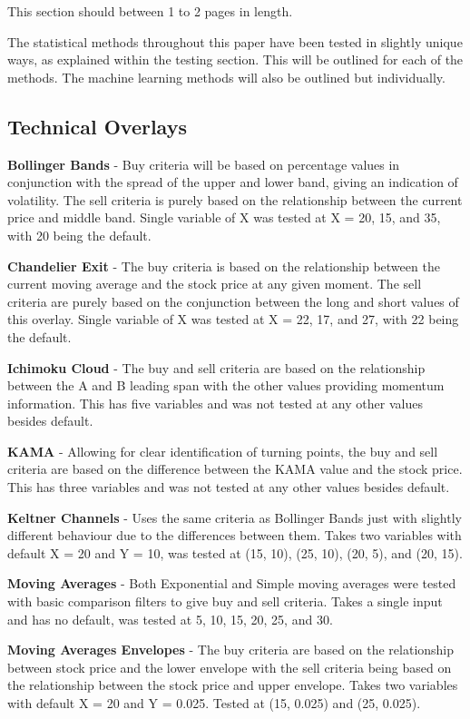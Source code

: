 \documentclass[conference]{IEEEtran}
\begin{document}
This section should between 1 to 2 pages in length.
\fi

The statistical methods throughout this paper have been tested in slightly unique ways, as explained within the testing section. This will be outlined for each of the methods. The machine learning methods will also be outlined but individually.\\

\subsection{Technical Overlays}

\textbf{Bollinger Bands} - Buy criteria will be based on percentage values in conjunction with the spread of the upper and lower band, giving an indication of volatility. The sell criteria is purely based on the relationship between the current price and middle band. Single variable of X was tested at X = 20, 15, and 35, with 20 being the default.

\textbf{Chandelier Exit} - The buy criteria is based on the relationship between the current moving average and the stock price at any given moment. The sell criteria are purely based on the conjunction between the long and short values of this overlay. Single variable of X was tested at X = 22, 17, and 27, with 22 being the default.

\textbf{Ichimoku Cloud} - The buy and sell criteria are based on the relationship between the A and B leading span with the other values providing momentum information. This has five variables and was not tested at any other values besides default.

\textbf{KAMA} - Allowing for clear identification of turning points, the buy and sell criteria are based on the difference between the KAMA value and the stock price. This has three variables and was not tested at any other values besides default.

\textbf{Keltner Channels} - Uses the same criteria as Bollinger Bands just with slightly different behaviour due to the differences between them. Takes two variables with default X = 20 and Y = 10, was tested at (15, 10), (25, 10), (20, 5), and (20, 15).

\textbf{Moving Averages} - Both Exponential and Simple moving averages were tested with basic comparison filters to give buy and sell criteria. Takes a single input and has no default, was tested at 5, 10, 15, 20, 25, and 30.

\textbf{Moving Averages Envelopes} - The buy criteria are based on the relationship between stock price and the lower envelope with the sell criteria being based on the relationship between the stock price and upper envelope. Takes two variables with default X = 20 and Y = 0.025. Tested at (15, 0.025) and (25, 0.025).
\end{document}
